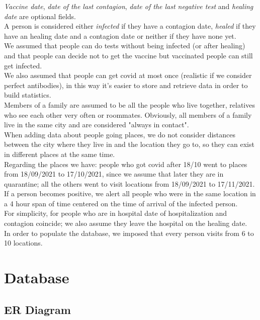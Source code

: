 \documentclass[12pt, a4paper]{article}
\begin{document}
\emph{Vaccine date}, \emph{date of the last contagion}, \emph{date of the last 
negative test} and \emph{healing date} are optional fields. \\ 
A person is considered either \emph{infected} if they have a contagion date, 
\emph{healed} if they have an healing date and a contagion date or neither if 
they have none yet. \\
We assumed that people can do tests without being infected (or after healing) 
and that people can decide not to get the vaccine but vaccinated people can 
still get infected. \\
We also assumed that people can get covid at most once (realistic if we 
consider perfect antibodies), in this way it's easier to store and retrieve 
data in order to build statistics. \\
Members of a family are assumed to be all the people who live together, 
relatives who see each other very often or roommates. Obviously, all members 
of a family live in the same city and are considered "always in contact". \\
When adding data about people going places, we do not consider distances 
between the city where they live in and the location they go to, so they can 
exist in different places at the same time.  \\   
Regarding the places we have: people who got covid after 18/10 went to places 
from 18/09/2021 to 17/10/2021, since we assume that later they are in 
quarantine; all the others went to visit locations from 18/09/2021 to 
17/11/2021. 
If a person becomes positive, we alert all people who were in the same location
in a 4 hour span of time centered on the time of arrival of the infected
person. \\
For simplicity, for people who are in hospital date of hospitalization and 
contagion coincide; we also assume they leave the hospital on the healing 
date.  \\
In order to populate the database, we imposed that every person visits from 6 
to 10 locations. 

\clearpage

\section{Database}

\subsection{ER Diagram}
\end{document}
